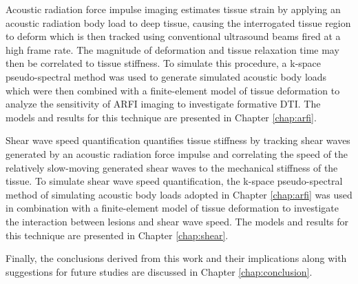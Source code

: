 		Acoustic radiation force impulse imaging estimates tissue strain by applying an acoustic radiation body load to deep tissue, causing the interrogated tissue region to deform which is then tracked using conventional ultrasound beams fired at a high frame rate. The magnitude of deformation and tissue relaxation time may then be correlated to tissue stiffness. To simulate this procedure, a k-space pseudo-spectral method was used to generate simulated acoustic body loads which were then combined with a finite-element model of tissue deformation to analyze the sensitivity of ARFI imaging to investigate formative DTI. The models and results for this technique are presented in Chapter \ref{chap:arfi}.

		Shear wave speed quantification quantifies tissue stiffness by tracking shear waves generated by an acoustic radiation force impulse and correlating the speed of the relatively slow-moving generated shear waves to the mechanical stiffness of the tissue. To simulate shear wave speed quantification, the k-space pseudo-spectral method of simulating acoustic body loads adopted in Chapter \ref{chap:arfi} was used in combination with a finite-element model of tissue deformation to investigate the interaction between lesions and shear wave speed. The models and results for this technique are presented in Chapter \ref{chap:shear}.

		Finally, the conclusions derived from this work and their implications along with suggestions for future studies are discussed in Chapter \ref{chap:conclusion}.

